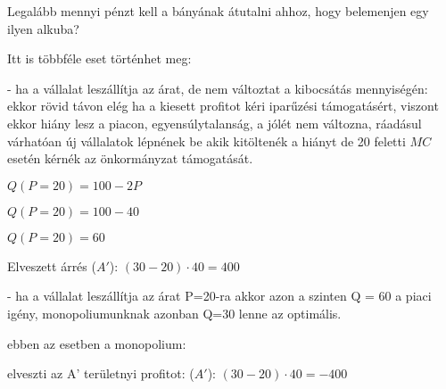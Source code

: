 \documentclass[10pt,a4paper]{article}
\begin{document}
\begin{enumerate}[label=(\alph*)]
Legalább mennyi pénzt kell a bányának átutalni ahhoz, hogy belemenjen egy ilyen alkuba? 



Itt is többféle eset történhet meg:

- ha a vállalat leszállítja az árat, de nem változtat a kibocsátás mennyiségén: ekkor rövid távon  elég ha a kiesett profitot kéri iparűzési támogatásért, viszont ekkor hiány lesz a piacon, egyensúlytalanság, a jólét nem változna,  ráadásul várhatóan új vállalatok lépnének be akik kitöltenék a hiányt de 20 feletti $MC$ esetén kérnék az önkormányzat támogatását. 


$Q(P=20) = 100-2P$

$Q(P=20) = 100-40$

$Q(P=20) = 60$

Elveszett árrés ($A'$): $(30-20) \cdot 40 = 400$

- ha a vállalat leszállítja az árat P=20-ra akkor azon a szinten Q = 60 a piaci igény, monopoliumunknak azonban Q=30 lenne az optimális.

ebben az esetben a monopolium: 

elveszti az A' területnyi profitot: ($A'$): $(30-20) \cdot 40 = -400$ 


\end{enumerate}
\end{document}

